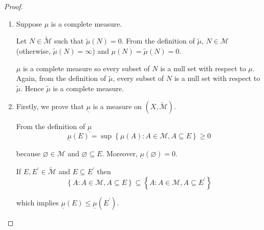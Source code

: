 \begin{proof}
\begin{enumerate}[itemsep=0pt,label=\textbf{\alph*.}]
              From the local measurability of \( E \) with respect to \( \widetilde{\mu} \), \( E \cap A \in \widetilde{\mathcal{M}} \). Because \( E \cap A \subseteq A \), \( \widetilde{\mu}(E \cap A) \le \widetilde{\mu}(A) \). Besides, \( \widetilde{\mu}(A) < \infty \) so \( \widetilde{\mu}(E \cap A) < \infty \). From the defintion of \( \widetilde{\mu} \), it is not the case that \( E \cap A \notin \mathcal{M} \) because if so, then \( \widetilde{\mu}(E \cap A) = \infty \). Hence \( E \cap A \in \mathcal{M} \), which means \( E \in \widetilde{\mathcal{M}} \).

              Hence every locally measurable set with respect to \( \widetilde{\mathcal{M}} \) is necessarily locally measurable with respect to \( \mathcal{M} \). This means \( \widetilde{\widetilde{M}} = \widetilde{M} \) and \( \widetilde{\mu} \) is saturated.
        \item Suppose \( \mu \) is a complete measure.

              Let \( N \in \widetilde{\mathcal{M}} \) such that \( \widetilde{\mu}(N) = 0 \). From the definition of \( \widetilde{\mu} \), \( N \in \mathcal{M} \) (otherwise, \( \widetilde{\mu}(N) = \infty \)) and \( \mu(N) = \widetilde{\mu}(N) = 0 \).

              \( \mu \) is a complete measure so every subset of \( N \) is a null set with respect to \( \mu \). Again, from the definition of \( \widetilde{\mu} \), every subset of \( N \) is a null set with respect to \( \widetilde{\mu} \). Hence \( \widetilde{\mu} \) is a complete measure.
        \item Firstly, we prove that \( \underline{\mu} \) is a measure on \( (X, \widetilde{\mathcal{M}}) \).

              From the definition of \( \underline{\mu} \)
              \[
                  \underline{\mu}(E) = \sup\left\{ \mu(A) : A \in \mathcal{M}, A \subseteq E \right\} \ge 0
              \]

              because \( \varnothing \in \mathcal{M} \) and \( \varnothing \subseteq E \). Moreover, \( \underline{\mu}(\varnothing) = 0 \).

              If \( E, E^{\prime} \in \widetilde{\mathcal{M}} \) and \( E \subseteq E^{\prime} \) then
              \[
                  \left\{ A : A \in \mathcal{M}, A \subseteq E \right\} \subseteq \left\{ A : A \in \mathcal{M}, A \subseteq E^{\prime} \right\}
              \]

              which implies \( \underline{\mu}(E) \le \underline{\mu}(E^{\prime}) \).


\end{enumerate}
\end{proof}
